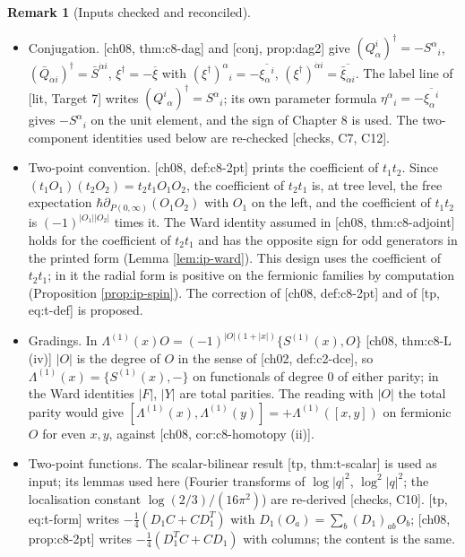\documentclass[11pt]{report}
\theoremstyle{plain}
\theoremstyle{definition}
\newtheorem{remark}[theorem]{Remark}
\numberwithin{equation}{chapter}
\begin{document}
\begin{remark}[Inputs checked and reconciled]
\label{rem:ip-inputs}
\begin{itemize}
\item Conjugation. [ch08, thm:c8-dag] and [conj, prop:dag2] give $(Q^i_\alpha)^\dagger=-S^\alpha{}_i$, $(\bar Q_{\dot\alpha i})^\dagger=\bar S^{\dot\alpha i}$, $\xi^\dagger=-\overline\xi$ with $(\xi^\dagger)^\alpha{}_i=-\overline{\xi_\alpha{}^i}$, $(\xi^\dagger)^{\dot\alpha i}=\overline{\bar\xi_{\dot\alpha i}}$. The label line of [lit, Target 7] writes $(Q^i{}_\alpha)^\dagger=S^\alpha{}_i$; its own parameter formula $\eta^\alpha{}_i=-\overline{\xi_\alpha{}^i}$ gives $-S^\alpha{}_i$ on the unit element, and the sign of Chapter 8 is used. The two-component identities used below are re-checked [checks, C7, C12].
\item Two-point convention. [ch08, def:c8-2pt] prints the coefficient of $t_1t_2$. Since $(t_1O_1)(t_2O_2)=t_2t_1O_1O_2$, the coefficient of $t_2t_1$ is, at tree level, the free expectation $\hbar\partial_{P(0,\infty)}(O_1O_2)$ with $O_1$ on the left, and the coefficient of $t_1t_2$ is $(-1)^{|O_1||O_2|}$ times it. The Ward identity assumed in [ch08, thm:c8-adjoint] holds for the coefficient of $t_2t_1$ and has the opposite sign for odd generators in the printed form (Lemma \ref{lem:ip-ward}). This design uses the coefficient of $t_2t_1$; in it the radial form is positive on the fermionic families by computation (Proposition \ref{prop:ip-spin}). The correction of [ch08, def:c8-2pt] and of [tp, eq:t-def] is proposed.
\item Gradings. In $\Lambda^{(1)}(x)O=(-1)^{|O|(1+|x|)}\{S^{(1)}(x),O\}$ [ch08, thm:c8-L (iv)] $|O|$ is the degree of $O$ in the sense of [ch02, def:c2-dce], so $\Lambda^{(1)}(x)=\{S^{(1)}(x),-\}$ on functionals of degree $0$ of either parity; in the Ward identities $|F|$, $|Y|$ are total parities. The reading with $|O|$ the total parity would give $[\Lambda^{(1)}(x),\Lambda^{(1)}(y)]=+\Lambda^{(1)}([x,y])$ on fermionic $O$ for even $x,y$, against [ch08, cor:c8-homotopy (ii)].
\item Two-point functions. The scalar-bilinear result [tp, thm:t-scalar] is used as input; its lemmas used here (Fourier transforms of $\log|q|^2$, $\log^2|q|^2$; the localisation constant $\log(2/3)/(16\pi^2)$) are re-derived [checks, C10]. [tp, eq:t-form] writes $-\tfrac14(D_1C+CD_1^T)$ with $D_1(O_a)=\sum_b(D_1)_{ab}O_b$; [ch08, prop:c8-2pt] writes $-\tfrac14(D_1^TC+CD_1)$ with columns; the content is the same.

\end{itemize}
\end{remark}
\end{document}
